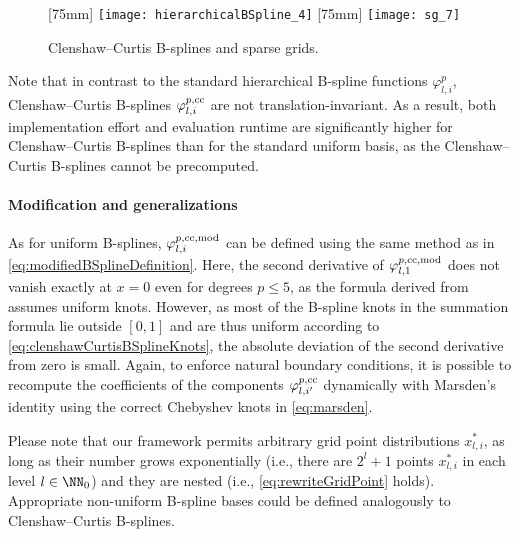 \begin{figure}
  [75mm]{%
    \texttt{[image: hierarchicalBSpline\_4]}%
  }%
  \hfill%
  [75mm]{%
    \texttt{[image: sg\_7]}%
  }%
  \caption{%
    Clenshaw--Curtis B-splines and sparse grids.%
  }
  \label{fig:clenshawCurtis}
\end{figure}

Note that in contrast to the standard hierarchical B-spline functions
$\varphi_{l,i}^p$, Clenshaw--Curtis B-splines
$\varphi_{l,i}^{p,\mathrm{cc}}$ are not translation-invariant.
As a result, both implementation effort and evaluation runtime
are significantly higher for Clenshaw--Curtis B-splines than
for the standard uniform basis,
as the Clenshaw--Curtis B-splines cannot be precomputed.

\paragraph{Modification and generalizations}

As for uniform B-splines,
$\varphi_{l,i}^{p,\mathrm{cc},\mathrm{mod}}$ can be defined using the
same method as in \eqref{eq:modifiedBSplineDefinition}.
Here, the second derivative of $\varphi_{l,1}^{p,\mathrm{cc},\mathrm{mod}}$
does not vanish exactly at $x = 0$ even for degrees $p \le 5$,
as the formula derived from  assumes uniform knots.
However, as most of the B-spline knots in the summation formula
lie outside $[0, 1]$ and are thus uniform according
to \eqref{eq:clenshawCurtisBSplineKnots},
the absolute deviation of the second derivative from zero is small.
Again, to enforce natural boundary conditions,
it is possible to recompute the coefficients
of the components $\varphi_{l,i'}^{p,\mathrm{cc}}$
dynamically with Marsden's identity using the correct Chebyshev knots
in \eqref{eq:marsden}.

Please note that our framework permits arbitrary grid point distributions
$x_{l,i}^\ast$,
as long as their number grows exponentially
(i.e., there are $2^l + 1$ points $x_{l,i}^\ast$ in each level $l \in \NN_0$)
and they are nested
(i.e., \eqref{eq:rewriteGridPoint} holds).
Appropriate non-uniform B-spline bases could be defined analogously
to Clenshaw--Curtis B-splines.
